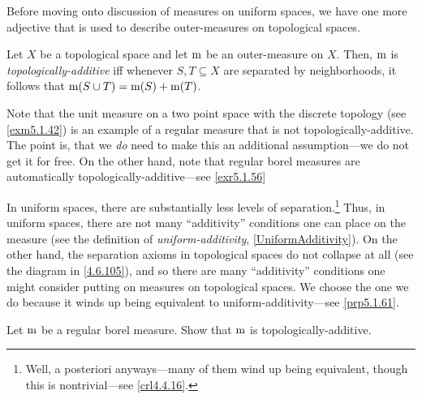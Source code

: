 Before moving onto discussion of measures on uniform spaces, we have one more adjective that is used to describe outer-measures on topological spaces.
\begin{dfn}\label{TopologicalAdditivity}
Let $X$ be a topological space and let $\mathrm{m}$ be an outer-measure on $X$.  Then, $\mathrm{m}$ is \emph{topologically-additive} iff whenever $S,T\subseteq X$ are separated by neighborhoods, it follows that $\mathrm{m} (S\cup T)=\mathrm{m} (S)+\mathrm{m} (T)$.
\begin{rmk}
Note that the unit measure on a two point space with the discrete topology (see \cref{exm5.1.42}) is an example of a regular measure that is not topologically-additive.  The point is, that we \emph{do} need to make this an additional assumption---we do not get it for free.  On the other hand, note that regular borel measures are automatically topologically-additive---see \cref{exr5.1.56}
\end{rmk}
\begin{rmk}
In uniform spaces, there are substantially less levels of separation.\footnote{Well, a posteriori anyways---many of them wind up being equivalent, though this is nontrivial---see \cref{crl4.4.16}.}  Thus, in uniform spaces, there are not many ``additivity'' conditions one can place on the measure (see the definition of \emph{uniform-additivity}, \cref{UniformAdditivity}).  On the other hand, the separation axioms in topological spaces do not collapse at all (see the diagram in \eqref{4.6.105}), and so there are many ``additivity'' conditions one might consider putting on measures on topological spaces.  We choose the one we do because it winds up being equivalent to uniform-additivity---see \cref{prp5.1.61}.
\end{rmk}
\end{dfn}
\begin{exr}\label{exr5.1.56}
Let $\mathrm{m}$ be a regular borel measure.  Show that $\mathrm{m}$ is topologically-additive.
\end{exr}
